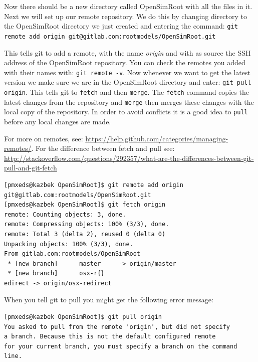\documentclass{article}
\begin{document}
\noindent Now there should be a new directory called OpenSimRoot with all the files in it. Next we will set up our remote repository. We do this by changing directory to the OpenSimRoot directory we just created and entering the command:
\verb|git remote add origin git@gitlab.com:rootmodels/OpenSimRoot.git| \newline

\noindent This tells git to add a remote, with the name \textit{origin} and with as source the SSH address of the OpenSimRoot repository. You can check the remotes you added with their names with: \verb|git remote -v|. Now whenever we want to get the latest version we make sure we are in the OpenSimRoot directory and enter: \verb|git pull origin|. This tells git to \verb|fetch| and then \verb|merge|. The \verb|fetch| command copies the latest changes from the repository and \verb|merge| then merges these changes with the local copy of the repository. In order to avoid conflicts it is a good idea to \verb|pull| before any local changes are made. \newline

\noindent For more on remotes, see: \url{https://help.github.com/categories/managing-remotes/}. For the difference between fetch and pull see: \\
 \url{http://stackoverflow.com/questions/292357/what-are-the-differences-between-git-pull-and-git-fetch}

\begin{verbatim}
[pmxeds@kazbek OpenSimRoot]$ git remote add origin git@gitlab.com:rootmodels/OpenSimRoot.git
[pmxeds@kazbek OpenSimRoot]$ git fetch origin 
remote: Counting objects: 3, done.
remote: Compressing objects: 100% (3/3), done.
remote: Total 3 (delta 2), reused 0 (delta 0)
Unpacking objects: 100% (3/3), done.
From gitlab.com:rootmodels/OpenSimRoot
 * [new branch]      master     -> origin/master
 * [new branch]      osx-r{}
edirect -> origin/osx-redirect
\end{verbatim}

\noindent When you tell git to pull you might get the following error message:

\begin{verbatim}
[pmxeds@kazbek OpenSimRoot]$ git pull origin
You asked to pull from the remote 'origin', but did not specify
a branch. Because this is not the default configured remote
for your current branch, you must specify a branch on the command line.
\end{verbatim}
\end{document}
